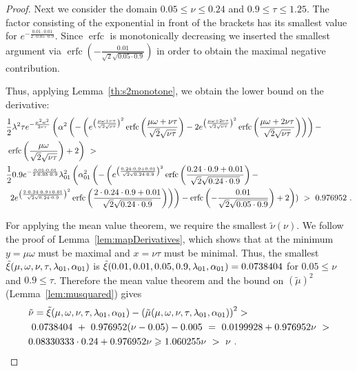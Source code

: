 \documentclass{article}
\newcommand\munn{{\tilde \mu}}
\newcommand\nunn{{\tilde \nu}}
\newcommand\xinn{{\tilde \xi}}
\renewcommand{\leq}{\leqslant}
\renewcommand{\geq}{\geqslant}
\DeclareMathOperator{\erfc}{erfc}
\begin{document}
\begin{proof}
Next we consider the domain 
$0.05 \leq \nu \leq 0.24$ 
and $0.9 \leq \tau \leq 1.25$.
The factor consisting of the exponential in front of the brackets has
its smallest value for $e^{-\frac{0.01 \cdot 0.01}{2 \cdot 0.05 \cdot 0.9}}$. 
Since $\erfc $ is monotonically decreasing we inserted the
smallest argument via $\erfc \left(-\frac{0.01}{\sqrt{2}
\sqrt{0.05 \cdot 0.9}}\right)$ in order to obtain the maximal negative contribution.

Thus, applying Lemma~\ref{th:s2monotone}, we obtain the lower bound on the derivative:
\begin{align}
&\frac{1}{2} \lambda ^2  \tau e^{-\frac{\mu^2 \omega^2}{2  \nu \tau}} \left(\alpha ^2 \left(-\left(e^{\left(\frac{\mu \omega+\nu \tau}{\sqrt{2} \sqrt{\nu \tau}}\right)^2} \erfc \left(\frac{\mu \omega+\nu \tau}{\sqrt{2} \sqrt{\nu \tau}}\right)-2 e^{\left(\frac{\mu \omega+2  \nu \tau}{\sqrt{2} \sqrt{\nu \tau}}\right)^2} \erfc \left(\frac{\mu \omega+2  \nu \tau}{\sqrt{2} \sqrt{\nu \tau}}\right)\right)\right)- \right.\\\nonumber &\left.\erfc \left(\frac{\mu \omega}{\sqrt{2} \sqrt{\nu \tau}}\right)+2\right)\ > \\ \nonumber &
\frac{1}{2} 0.9 e^{-\frac{0.01 \cdot 0.01}{2 \cdot 0.05 \cdot 0.9}} \lambda_{\rm 01}^2 \left(\alpha_{\rm 01}^2 \left(-\left(e^{\left(\frac{0.24 \cdot 0.9+0.01}{\sqrt{2} \sqrt{0.24 \cdot 0.9}}\right)^2} \erfc \left(\frac{0.24 \cdot 0.9+0.01}{\sqrt{2} \sqrt{0.24 \cdot 0.9}}\right)-\right.\right.\right.\\\nonumber &\left.\left.\left.2 e^{\left(\frac{2 \cdot  0.24 \cdot 0.9+0.01}{\sqrt{2} \sqrt{0.24 \cdot 0.9}}\right)^2} \erfc \left(\frac{2 \cdot 0.24 \cdot 0.9+0.01}{\sqrt{2} \sqrt{0.24 \cdot 0.9}}\right)\right)\right)-\erfc \left(-\frac{0.01}{\sqrt{2} \sqrt{0.05 \cdot 0.9}}\right)+2\right))\ > \ 0.976952 \ .
\end{align}

For applying the mean value theorem, we require the smallest $\nunn(\nu)$.
We follow the proof of Lemma~\ref{lem:mapDerivatives}, which shows
that at the minimum $y=\mu \omega$ must be maximal 
and $x=\nu \tau$ must be minimal.
Thus, the smallest 
$\xinn(\mu,\omega,\nu,\tau,\lambda_{\rm 01},\alpha_{\rm 01})$
is 
$\xinn(0.01,0.01,0.05,0.9,\lambda_{\rm 01},\alpha_{\rm 01})=0.0738404$
for $0.05 \leq \nu$ and $0.9 \leq \tau$.
Therefore the mean value theorem and the bound on $(\munn)^2$ (Lemma~\ref{lem:musquared}) gives
\begin{align}
&\nunn = \xinn(\mu,\omega,\nu,\tau,\lambda_{\rm 01},\alpha_{\rm 01}) - \left(\munn(\mu,\omega,\nu,\tau,\lambda_{\rm 01},\alpha_{\rm 01})\right)^2 > \\ \nonumber
& \ 0.0738404 \ + \  0.976952 (\nu-0.05) - 0.005\ = \ 0.0199928 + 0.976952 \nu \ > \\ \nonumber 
&0.08330333  \cdot  0.24  + 0.976952  \nu \geq 1.060255 \nu \ > \ \nu \ .
\end{align}

\end{proof}
\end{document}
